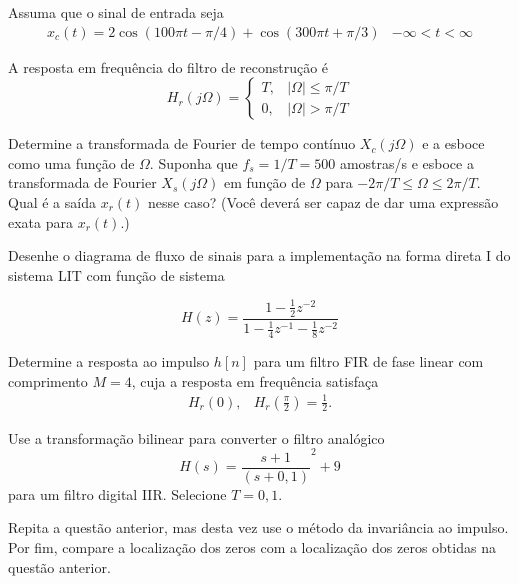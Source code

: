 \documentclass[12pt,a4paper]{article}
\begin{document}
Assuma que o sinal de entrada seja
\[\begin{array}{lr}
    x_c(t) = 2 \cos(100\pi t - \pi /4) + \cos(300\pi t + \pi /3) & -\infty < t < \infty
\end{array}\]

A resposta em frequência do filtro de reconstrução é
\[H_r(j \Omega) = \left\{ \begin{array}{lr}
    T, & \left|\Omega\right| \leq \pi/T \\
    0, & \left|\Omega\right| > \pi/T
\end{array} \right.\]

\subproblem Determine a transformada de Fourier de tempo contínuo \(X_c(j\Omega)\) e a esboce como uma função de \(\Omega\).
\subproblem Suponha que \(f_s = 1/T = 500\) amostras/s e esboce a transformada de Fourier \(X_s(j\Omega)\) em função de \(\Omega\) para \(-2\pi/T \leq \Omega \leq 2\pi/T\). Qual é a saída \(x_r(t)\) nesse caso? (Você deverá ser capaz de dar uma expressão exata para \(x_r(t)\).)

\answer
\problem Desenhe o diagrama de fluxo de sinais para a implementação na forma direta I do sistema LIT com função de sistema

\begin{equation}
    H(z) = \frac{1- \frac{1}{2}z^{-2}}{1- \frac{1}{4}z^{-1} - \frac{1}{8}z^{-2}}
\end{equation}

\answer
\problem Determine a resposta ao impulso \(h\left[n\right]\) para um filtro FIR de fase linear com comprimento \(M=4\), cuja a resposta em frequência satisfaça
\[
\begin{array}{lr}
    H_r \left(0\right), & H_r \left(\frac{\pi}{2}\right) = \frac{1}{2}.
\end{array}
\]

\answer
\problem Use a transformação bilinear para converter o filtro analógico
\[H(s) = \frac{s+1}{(s+0,1)}^2+9\]
para um filtro digital IIR. Selecione \(T=0,1\).

\problem Repita a questão anterior, mas desta vez use o m\'etodo da invariância ao impulso. Por fim, compare a localização dos zeros com a localização dos zeros obtidas na questão anterior.
\end{document}
